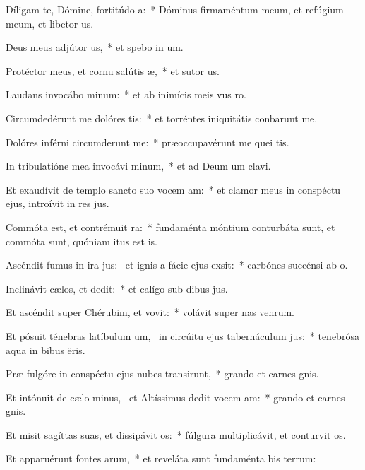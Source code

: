 \item Díligam te, Dómine, fortitúdo a:~* Dóminus firmaméntum meum, et refúgium meum, et libetor us.
\item Deus meus adjútor us,~* et spebo in um.
\item Protéctor meus, et cornu salútis æ,~* et sutor us.
\item Laudans invocábo minum:~* et ab inimícis meis vus ro.
\item Circumdedérunt me dolóres tis:~* et torréntes iniquitátis conbarunt me.
\item Dolóres inférni circumderunt me:~* præoccupavérunt me quei tis.
\item In tribulatióne mea invocávi minum,~* et ad Deum um clavi.
\item Et exaudívit de templo sancto suo vocem am:~* et clamor meus in conspéctu ejus, introívit in res jus.
\item Commóta est, et contrémuit ra:~* fundaménta móntium conturbáta sunt, et commóta sunt, quóniam itus est is.
\item Ascéndit fumus in ira jus:~\pscross{} et ignis a fácie ejus exsit:~* carbónes succénsi  ab o.
\item Inclinávit cælos, et dedit:~* et calígo sub dibus jus.
\item Et ascéndit super Chérubim, et vovit:~* volávit super nas venrum.
\item Et pósuit ténebras latíbulum um,~\pscross{} in circúitu ejus tabernáculum jus:~* tenebrósa aqua in bibus ëris.
\item Præ fulgóre in conspéctu ejus nubes transirunt,~* grando et carnes gnis.
\item Et intónuit de cælo minus,~\pscross{} et Altíssimus dedit vocem am:~* grando et carnes gnis.
\item Et misit sagíttas suas, et dissipávit os:~* fúlgura multiplicávit, et conturvit os.
\item Et apparuérunt fontes arum,~* et reveláta sunt fundaménta bis terrum:
